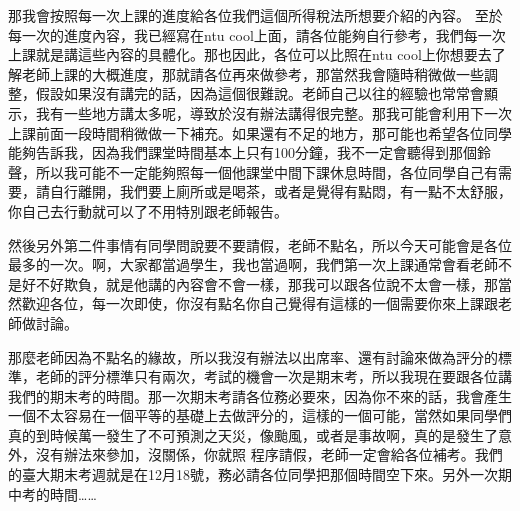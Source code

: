 \documentclass[]{ctexbook}
\begin{document}
那我會按照每一次上課的進度給各位我們這個所得稅法所想要介紹的內容。
至於每一次的進度內容，我已經寫在ntu cool上面，請各位能夠自行參考，我們每一次上課就是講這些內容的具體化。那也因此，各位可以比照在ntu cool上你想要去了解老師上課的大概進度，那就請各位再來做參考，那當然我會隨時稍微做一些調整，假設如果沒有講完的話，因為這個很難說。老師自己以往的經驗也常常會顯示，我有一些地方講太多呢，導致於沒有辦法講得很完整。那我可能會利用下一次上課前面一段時間稍微做一下補充。如果還有不足的地方，那可能也希望各位同學能夠告訴我，因為我們課堂時間基本上只有100分鐘，我不一定會聽得到那個鈴聲，所以我可能不一定能夠照每一個他課堂中間下課休息時間，各位同學自己有需要，請自行離開，我們要上廁所或是喝茶，或者是覺得有點悶，有一點不太舒服，你自己去行動就可以了不用特別跟老師報告。

然後另外第二件事情有同學問說要不要請假，老師不點名，所以今天可能會是各位最多的一次。啊，大家都當過學生，我也當過啊，我們第一次上課通常會看老師不是好不好欺負，就是他講的內容會不會一樣，那我可以跟各位說不太會一樣，那當然歡迎各位，每一次即使，你沒有點名你自己覺得有這樣的一個需要你來上課跟老師做討論。

那麼老師因為不點名的緣故，所以我沒有辦法以出席率、還有討論來做為評分的標準，老師的評分標準只有兩次，考試的機會一次是期末考，所以我現在要跟各位講我們的期末考的時間。那一次期末考請各位務必要來，因為你不來的話，我會產生一個不太容易在一個平等的基礎上去做評分的，這樣的一個可能，當然如果同學們真的到時候萬一發生了不可預測之天災，像颱風，或者是事故啊，真的是發生了意外，沒有辦法來參加，沒關係，你就照 程序請假，老師一定會給各位補考。我們的臺大期末考週就是在12月18號，務必請各位同學把那個時間空下來。另外一次期中考的時間\ldots\ldots{}
\end{document}
